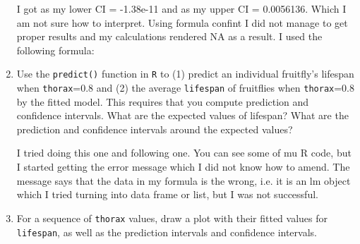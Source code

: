 \documentclass[12pt,letterpaper]{article}
\begin{document}
\begin{enumerate}
	I got as my lower CI = -1.38e-11 and as my upper CI = 0.0056136. Which I am not sure how to interpret. Using formula confint I did not manage to get proper results and my calculations rendered NA as a result. I used the following formula:
	
	
	
	\item Use the \texttt{predict()} function in \texttt{R} to (1) predict an individual fruitfly's lifespan when \texttt{thorax}=0.8 and (2) the average \texttt{lifespan} of fruitflies when \texttt{thorax}=0.8 by the fitted model. This requires that you compute prediction and confidence intervals. What are the expected values of lifespan? What are the prediction and confidence intervals around the expected values? 
	
			\vspace{1cm}
		I tried doing this one and following one. You can see some of mu R code, but I started getting the error message which I did not know how to amend. The message says that the data in my formula is the wrong, i.e. it is an lm object which I tried turning into data frame or list, but I was not successful. 
	\item	For a sequence of \texttt{thorax} values, draw a plot with their fitted values for \texttt{lifespan}, as well as the prediction intervals and confidence intervals.



\end{enumerate}
\end{document}
